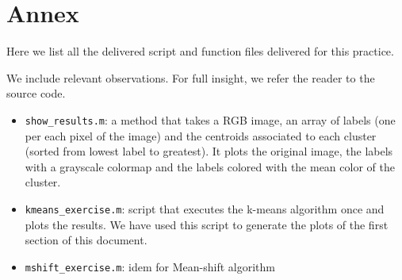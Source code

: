 \section{Annex}

Here we list all the delivered script and function files delivered for this practice.

We include relevant observations. For full insight, we refer the reader to the
source code.

\begin{itemize}
	\item \texttt{show\_results.m}: a method that takes a RGB image, an array of labels (one per
	each pixel of the image) and the
	centroids associated to each cluster (sorted from lowest label to greatest). It plots the
	original image, the labels with a grayscale colormap and the labels colored with
	the mean color of the cluster.
	\item \texttt{kmeans\_exercise.m}: script that executes the k-means algorithm once and plots
	the results. We have used this script to generate the plots of the first section of this
	document.
	\item \texttt{mshift\_exercise.m}: idem for Mean-shift algorithm
\end{itemize}


